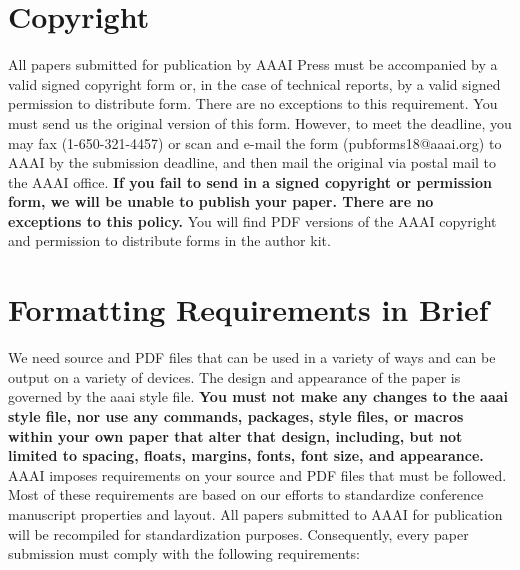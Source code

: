 \documentclass[letterpaper]{article} %
\begin{document}
\section{Copyright}
All papers submitted for publication by AAAI Press must be accompanied by a valid signed copyright form or, in the case of technical reports, by a valid signed permission to distribute form. There are no exceptions to this requirement. You must send us the original version of this form. However, to meet the deadline, you may fax (1-650-321-4457) or scan and e-mail the form (pubforms18@aaai.org) to AAAI by the submission deadline, and then mail the original via postal mail to the AAAI office. \textbf{If you fail to send in a signed copyright or permission form, we will be unable to publish your paper. There are no exceptions to this policy.} You will find PDF versions of the AAAI copyright and permission to distribute forms in the author kit.

\section{Formatting Requirements in Brief}
We need source and PDF files that can be used in a variety of ways and can be output on a variety of devices. The design and appearance of the paper is governed by the aaai style file. 
\textbf{You must not make any changes to the aaai style file, nor use any commands, packages, style files, or macros within your own paper that alter that design, including, but not limited to spacing, floats, margins, fonts, font size, and appearance.} AAAI imposes  requirements on your source and PDF files that must be followed. Most of these requirements are based on our efforts to standardize conference manuscript properties and layout. All papers submitted to AAAI for publication will be recompiled for standardization purposes. Consequently, every paper submission must comply with the following requirements:
\end{document}
